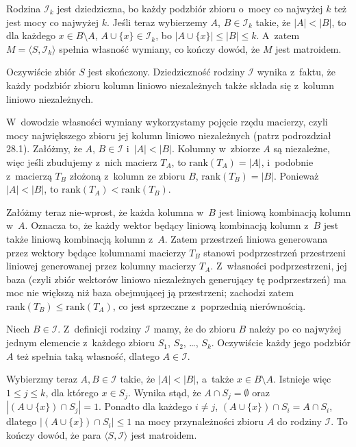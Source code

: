 
\exercise %
Rodzina $\mathcal{I}_k$ jest dziedziczna, bo każdy podzbiór zbioru o~mocy co najwyżej $k$ też jest mocy co najwyżej $k$.
Jeśli teraz wybierzemy $A$, $B\in\mathcal{I}_k$ takie, że $|A|<|B|$, to dla każdego $x\in B\setminus A$, $A\cup\{x\}\in\mathcal{I}_k$, bo $|A\cup\{x\}|\le|B|\le k$.
A~zatem $M=\langle S,\mathcal{I}_k\rangle$ spełnia własność wymiany, co kończy dowód, że $M$ jest matroidem.

\exercise %
Oczywiście zbiór $S$ jest skończony.
Dziedziczność rodziny $\mathcal{I}$ wynika z~faktu, że każdy podzbiór zbioru kolumn liniowo niezależnych także składa się z~kolumn liniowo niezależnych.

W~dowodzie własności wymiany wykorzystamy pojęcie rzędu macierzy, czyli mocy największego zbioru jej kolumn liniowo niezależnych (patrz podrozdział 28.1).
Załóżmy, że $A$, $B\in\mathcal{I}$ i~$|A|<|B|$.
Kolumny w~zbiorze $A$ są niezależne, więc jeśli zbudujemy z~nich macierz $T_A$, to $\mathrm{rank}(T_A)=|A|$, i~podobnie z~macierzą $T_B$ złożoną z~kolumn ze zbioru $B$, $\mathrm{rank}(T_B)=|B|$.
Ponieważ $|A|<|B|$, to $\mathrm{rank}(T_A)<\mathrm{rank}(T_B)$.

Załóżmy teraz nie-wprost, że każda kolumna w~$B$ jest liniową kombinacją kolumn w~$A$.
Oznacza to, że każdy wektor będący liniową kombinacją kolumn z~$B$ jest także liniową kombinacją kolumn z~$A$.
Zatem przestrzeń liniowa generowana przez wektory będące kolumnami macierzy $T_B$ stanowi podprzestrzeń przestrzeni liniowej generowanej przez kolumny macierzy $T_A$.
Z~własności podprzestrzeni, jej baza (czyli zbiór wektorów liniowo niezależnych generujący tę podprzestrzeń) ma moc nie większą niż baza obejmującej ją przestrzeni; zachodzi zatem $\mathrm{rank}(T_B)\le\mathrm{rank}(T_A)$, co jest sprzeczne z~poprzednią nierównością.

\exercise %
\exercise %
Niech $B\in\mathcal{I}$.
Z~definicji rodziny $\mathcal{I}$ mamy, że do zbioru $B$ należy po co najwyżej jednym elemencie z~każdego zbioru $S_1$, $S_2$, \dots, $S_k$.
Oczywiście każdy jego podzbiór $A$ też spełnia taką własność, dlatego $A\in\mathcal{I}$.

Wybierzmy teraz $A,B\in\mathcal{I}$ takie, że $|A|<|B|$, a~także $x\in B\setminus A$.
Istnieje więc $1\le j\le k$, dla którego $x\in S_j$.
Wynika stąd, że $A\cap S_j=\emptyset$ oraz $|(A\cup\{x\})\cap S_j|=1$.
Ponadto dla każdego $i\ne j$, $(A\cup\{x\})\cap S_i=A\cap S_i$, dlatego $|(A\cup\{x\})\cap S_i|\le1$ na mocy przynależności zbioru $A$ do rodziny $\mathcal{I}$.
To kończy dowód, że para $\langle S,\mathcal{I}\rangle$ jest matroidem.

\exercise %
